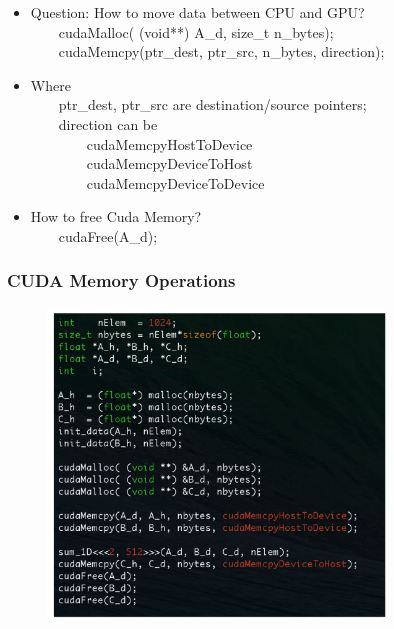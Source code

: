 \documentclass[xcolor={x11names,svgnames,dvipsnames}]{beamer}
\begin{document}
\begin{frame}
\begin{itemize}
\item Question: How to move data between CPU and GPU?\\
\ \ \ \ cudaMalloc( (void**) A\_d, size\_t n\_bytes);\\
\ \ \ \ cudaMemcpy(ptr\_dest, ptr\_src, n\_bytes, direction);\\
\item Where\\
\ \ \ \ ptr\_dest, ptr\_src are destination/source pointers;\\
\ \ \ \ direction can be\\
\ \ \ \ \ \ \ \ cudaMemcpyHostToDevice\\
\ \ \ \ \ \ \ \ cudaMemcpyDeviceToHost\\
\ \ \ \ \ \ \ \ cudaMemcpyDeviceToDevice\\
\item How to free Cuda Memory?\\
\ \ \ \ cudaFree(A\_d);
\end{itemize}
\end{frame}

\begin{frame}
\frametitle{CUDA Memory Operations}
 \begin{figure}
     \includegraphics[width=0.8\textwidth, height=0.8\textheight]{code.png}
\end{figure}
\end{frame}
\end{document}
